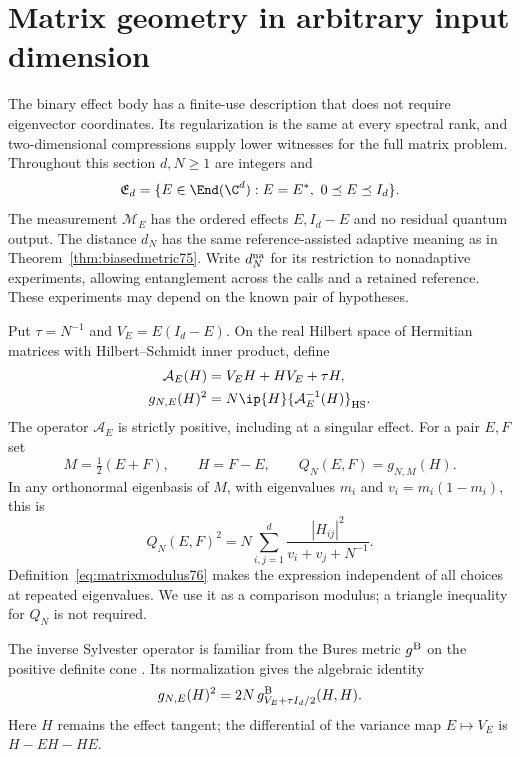 \section{Matrix geometry in arbitrary input dimension}
\label{sec:matrixmetric76}

The binary effect body has a finite-use description that does not
require eigenvector coordinates.  Its regularization is the same at
every spectral rank, and two-dimensional compressions supply lower
witnesses for the full matrix problem.  Throughout this section
$d,N\ge1$ are integers and
\begin{equation}\label{eq:matrixbody76}
 \mathfrak E_d=\{E\in\End(\C^d):E=E^*,\ 0\preceq E\preceq I_d\}.
\end{equation}
The measurement $\mathcal M_E$ has the ordered effects $E,I_d-E$
and no residual quantum output.  The distance $d_N$ has the same
reference-assisted adaptive meaning as in
Theorem~\ref{thm:biasedmetric75}.  Write $d_N^{\rm na}$ for its
restriction to nonadaptive experiments, allowing entanglement across
the calls and a retained reference.  These experiments may depend on
the known pair of hypotheses.

Put $\tau=N^{-1}$ and $V_E=E(I_d-E)$.  On the real Hilbert space
of Hermitian matrices with Hilbert--Schmidt inner product, define
\begin{align}
 \mathcal A_E(H)&=V_EH+HV_E+\tau H,
                                      \label{eq:matrixoperator76}\\
 g_{N,E}(H)^2&=N\ip{H}{\mathcal A_E^{-1}(H)}_{\rm HS}.
                                      \label{eq:matrixform76}
\end{align}
The operator $\mathcal A_E$ is strictly positive, including at a
singular effect.  For a pair $E,F$ set
\begin{equation}\label{eq:matrixmodulus76}
 M=\tfrac12(E+F),\qquad H=F-E,\qquad
 Q_N(E,F)=g_{N,M}(H).
\end{equation}
In any orthonormal eigenbasis of $M$, with eigenvalues $m_i$ and
$v_i=m_i(1-m_i)$, this is
\begin{equation}\label{eq:matrixcoordinates76}
 Q_N(E,F)^2=N\sum_{i,j=1}^d
                \frac{|H_{ij}|^2}{v_i+v_j+N^{-1}}.
\end{equation}
Definition~\eqref{eq:matrixmodulus76} makes the expression independent
of all choices at repeated eigenvalues.  We use it as a comparison
modulus; a triangle inequality for $Q_N$ is not required.

The inverse Sylvester operator is familiar from the Bures metric
$g^{\rm B}$ on the positive definite cone \cite{Dittmann76}.
Its normalization gives the algebraic identity
\[
 g_{N,E}(H)^2=2N\,g^{\rm B}_{V_E+\tau I_d/2}(H,H).
\]
Here $H$ remains the effect tangent; the differential of the
variance map $E\mapsto V_E$ is $H-EH-HE$.

